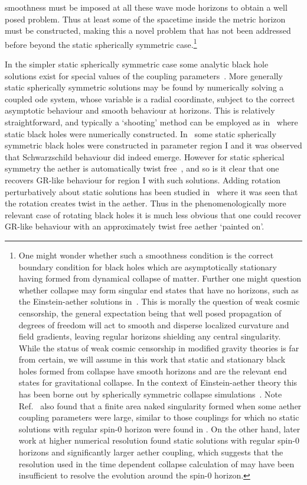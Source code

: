 \documentclass[12pt]{article}
\numberwithin{equation}{section}
\begin{document}
smoothness must be imposed at all these  wave mode horizons to obtain a well posed problem. Thus at least some of the spacetime inside the metric horizon must be constructed, making this a novel problem that has not been addressed before beyond the static spherically symmetric case.\footnote{One might wonder whether such a smoothness condition is the correct boundary condition for black holes which are asymptotically stationary having formed from dynamical collapse of matter. Further one might question whether collapse may form singular end states that have no horizons, such as the Einstein-aether solutions in~\cite{Eling:2006df,Oost:2021tqi}.
This is morally the question of weak cosmic censorship, the general expectation being that well posed propagation of degrees of freedom will act to smooth and disperse localized curvature and field gradients, leaving regular horizons shielding any central singularity. While the status of weak cosmic censorship in modified gravity theories is far from certain, we will assume 
in 
this work that static 
and stationary black holes formed from collapse have smooth horizons and are the relevant end states for gravitational collapse. 
In the context of Einstein-aether theory this has been borne out by spherically symmetric collapse simulations~\cite{Garfinkle:2007bk}.
Note Ref.~\cite{Garfinkle:2007bk} also found that a finite area naked singularity formed when some aether coupling parameters
were large,  similar to those couplings for which no static solutions with regular spin-0 horizon were found in \cite{Eling:2006ec}.
On the other hand, later work \cite{Barausse:2011pu} at higher numerical resolution found static solutions with regular spin-0 horizons and significantly larger aether coupling, which suggests that the resolution used in the time dependent collapse calculation of \cite{Garfinkle:2007bk} may have been insufficient to resolve the evolution around the spin-0 horizon. 
}



In the simpler static spherically symmetric case some analytic black hole solutions exist
for special values of the coupling parameters~\cite{Berglund:2012bu}. More generally static spherically  symmetric  solutions  may be found by numerically solving a coupled ode system, whose variable is a radial coordinate, subject to the correct asymptotic behaviour and smooth behaviour at horizons.  
This is relatively straightforward, and typically a ‘shooting’ method can be employed as in~\cite{Eling:2006ec,Barausse:2011pu} where static black holes were numerically constructed. In~\cite{Zhang:2020too}  some static spherically symmetric black holes were constructed in parameter region I and it was observed that Schwarzschild behaviour did indeed emerge. However for static spherical symmetry the aether is automatically twist free~\cite{Eling:2003rd}, and so is it clear that one recovers GR-like behaviour for region I with such solutions. Adding rotation perturbatively about static solutions has been studied in~\cite{Barausse:2015frm} where it was seen that the rotation creates twist in the aether. Thus in the phenomenologically more relevant case of rotating black holes it is much less obvious that one could recover GR-like behaviour with an approximately twist free aether `painted on'.
\end{document}
